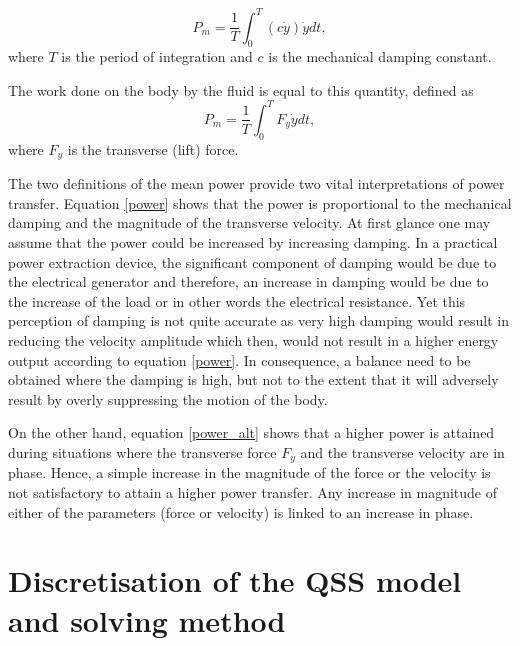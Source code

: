 \begin{equation}
\label{power}
P_{m}=\frac{1}{T}\int_{0}^{T}(c\dot{y})\dot{y} dt,
\end{equation}
where $T$ is the period of integration and $c$ is the mechanical damping constant. 

The work done on the body by the fluid is equal to this quantity, defined as
\begin{equation}
\label{power_alt}
P_{m}=\frac{1}{T}\int_{0}^{T}F_y\dot{y} dt,
\end{equation}
where $F_y$ is the transverse (lift) force.

The two definitions of the mean power provide two vital interpretations of power transfer. Equation \ref{power} shows that the power is proportional to the mechanical damping and the magnitude of the transverse velocity. At first glance one may assume that the power could be increased by increasing damping. In a practical power extraction device, the significant component of damping would be due to the electrical generator and therefore, an increase in damping would be due to the increase of the load or in other words the electrical resistance. Yet this perception of damping is not quite accurate as very high damping would result in reducing the velocity amplitude which then, would not result in a higher energy output according to equation \ref{power}. In consequence, a balance need to be obtained where the damping is high, but not to the extent that it will adversely result by overly suppressing the motion of the body.  

On the other hand, equation \ref{power_alt} shows that a higher power is attained during situations where the transverse force $F_{y}$ and the transverse velocity are in phase. Hence, a simple increase in the magnitude of the force or the velocity is not satisfactory to attain a higher power transfer. Any increase in magnitude of either of the parameters (force or velocity) is linked to an increase in phase.   

\section{Discretisation of the QSS model and solving method}















